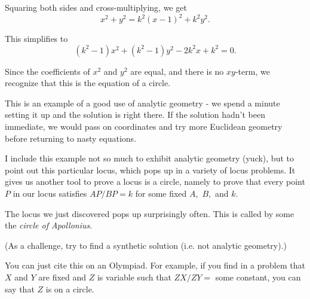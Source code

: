 Squaring both sides and cross-multiplying, we get
$$x^2 + y^2 = k^2 (x - 1)^2 + k^2 y^2.$$

This simplifies to
$$(k^2 - 1) x^2 + (k^2 - 1)y^2 - 2k^2 x + k^2 = 0.$$

Since the coefficients of $x^2$ and $y^2$ are equal, and there is no $xy$-term, we recognize that this is the equation of a circle.

This is an example of a good use of analytic geometry - we spend a minute setting it up and the solution is right there. If the solution hadn't been immediate, we would pass on coordinates and try more Euclidean geometry before returning to nasty equations.

I include this example not so much to exhibit analytic geometry (yuck), but to point out this particular locus, which pops up in a variety of locus problems. It gives us another tool to prove a locus is a circle, namely to prove that every point $P$ in our locus satisfies $AP/BP = k$ for some fixed $A,$ $B,$ and $k.$

\begin{note}
    The locus we just discovered pops up surprisingly often. This is called by some the \emph{circle of Apollonius}. 
\end{note}
(As a challenge, try to find a synthetic solution (i.e. not analytic geometry).)    

You can just cite this on an Olympiad. For example, if you find in a problem that $X$ and $Y$ are fixed and $Z$ is variable such that $ZX/ZY =$ some constant, you can say that $Z$ is on a circle.





